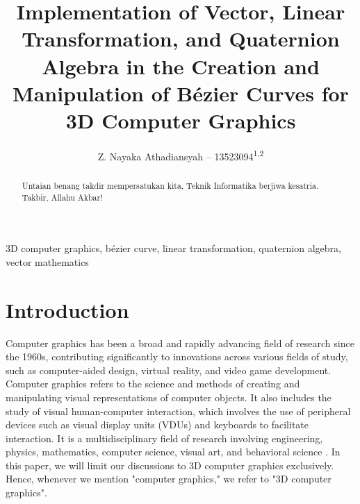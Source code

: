 \documentclass[conference]{IEEEtran}
\begin{document}
\title{Implementation of Vector, Linear Transformation, and Quaternion Algebra in the Creation and Manipulation of Bézier Curves for 3D Computer Graphics}

\author{{Z. Nayaka Athadiansyah -- 13523094\textsuperscript{1,2}} \\
}

\maketitle

\begin{abstract}
Untaian benang takdir mempersatukan kita, Teknik Informatika berjiwa kesatria. Takbir, Allahu Akbar!
\end{abstract}

\begin{IEEEkeywords}
3D computer graphics, bézier curve, linear transformation, quaternion algebra, vector mathematics
\end{IEEEkeywords}

\section{Introduction}Computer graphics has been a broad and rapidly advancing field of research since the 1960s, contributing significantly to innovations across various fields of study\cite{hughes}, such as computer-aided design, virtual reality, and video game development. Computer graphics refers to the science and methods of creating and manipulating visual representations of computer objects\cite{eck}. It also includes the study of visual human-computer interaction, which involves the use of peripheral devices such as visual display units (VDUs) and keyboards to facilitate interaction. It is a multidisciplinary field of research involving engineering, physics, mathematics, computer science, visual art, and behavioral science \cite{hughes}. In this paper, we will limit our discussions to 3D computer graphics exclusively. Hence, whenever we mention "computer graphics," we refer to "3D computer graphics".
\end{document}
